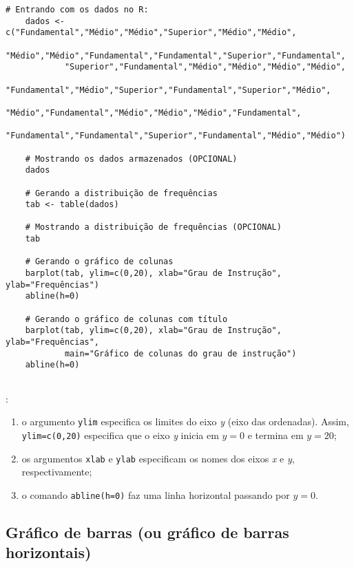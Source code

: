 \documentclass[11pt,fleqn]{book} %
\begin{document}
\begin{scriptsize}
	\estiloR
	\begin{lstlisting}[caption={Comandos do software R}, label=lst:Rgraf2]
	# Entrando com os dados no R:
	dados <- c("Fundamental","Médio","Médio","Superior","Médio","Médio",
			"Médio","Médio","Fundamental","Fundamental","Superior","Fundamental",
			"Superior","Fundamental","Médio","Médio","Médio","Médio",
			"Fundamental","Médio","Superior","Fundamental","Superior","Médio",
			"Médio","Fundamental","Médio","Médio","Médio","Fundamental",
			"Fundamental","Fundamental","Superior","Fundamental","Médio","Médio")
	
	# Mostrando os dados armazenados (OPCIONAL)
	dados
	
	# Gerando a distribuição de frequências
	tab <- table(dados)

	# Mostrando a distribuição de frequências (OPCIONAL)
	tab
	
	# Gerando o gráfico de colunas
	barplot(tab, ylim=c(0,20), xlab="Grau de Instrução", ylab="Frequências")
	abline(h=0)
	
	# Gerando o gráfico de colunas com título
	barplot(tab, ylim=c(0,20), xlab="Grau de Instrução", ylab="Frequências",
			main="Gráfico de colunas do grau de instrução")
	abline(h=0)
	
	\end{lstlisting}
\end{scriptsize}

\vspace{2 cm}

: 

\begin{enumerate}[label=\alph*)]

\item o argumento \texttt{ylim} especifica os limites do eixo {\itshape y} (eixo das ordenadas). Assim, \texttt{ylim=c(0,20)} especifica que o eixo {\itshape y} inicia em $y=0$ e termina em $y=20$;

\item os argumentos \texttt{xlab} e \texttt{ylab} especificam os nomes dos eixos {\itshape x} e {\itshape y}, respectivamente;

\item o comando \texttt{abline(h=0)} faz uma linha horizontal passando por $y=0$.

\end{enumerate}


\subsection{Gráfico de barras (ou gráfico de barras horizontais)}
\end{document}
